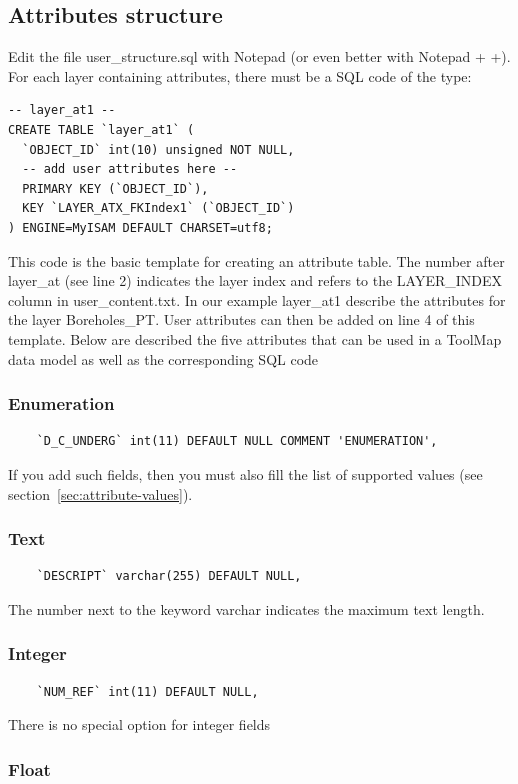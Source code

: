 \documentclass[a4paper, 12pt]{article}
\begin{document}
\subsection{Attributes structure}
Edit the file user\_structure.sql with Notepad (or even better with Notepad + +). For each layer containing attributes, there must be a SQL code of the type:

\begin{lstlisting}
-- layer_at1 --
CREATE TABLE `layer_at1` (
  `OBJECT_ID` int(10) unsigned NOT NULL,
  -- add user attributes here --
  PRIMARY KEY (`OBJECT_ID`),
  KEY `LAYER_ATX_FKIndex1` (`OBJECT_ID`)
) ENGINE=MyISAM DEFAULT CHARSET=utf8;
\end{lstlisting}
This code is the basic template for creating an attribute table. The number after layer\_at (see line 2) indicates the layer index and refers to the LAYER\_INDEX column in user\_content.txt. In our example layer\_at1 describe the attributes for the layer Boreholes\_PT. User attributes can then be added on line 4 of this template.
Below are described the five attributes that can be used in a ToolMap data model as well as the corresponding SQL code
\subsubsection {Enumeration}
\label{sec:enumeration}
    \begin{lstlisting}
    `D_C_UNDERG` int(11) DEFAULT NULL COMMENT 'ENUMERATION',
    \end{lstlisting}
    If you add such fields, then you must also fill the list of supported values (see section~\ref{sec:attribute-values}).
    \subsubsection {Text}
    \begin{lstlisting}
    `DESCRIPT` varchar(255) DEFAULT NULL,
    \end{lstlisting}
    The number next to the keyword varchar indicates the maximum text length. 
    \subsubsection {Integer}
    \begin{lstlisting}
    `NUM_REF` int(11) DEFAULT NULL,       
    \end{lstlisting}
    There is no special option for integer fields
  \subsubsection {Float}
\end{document}
